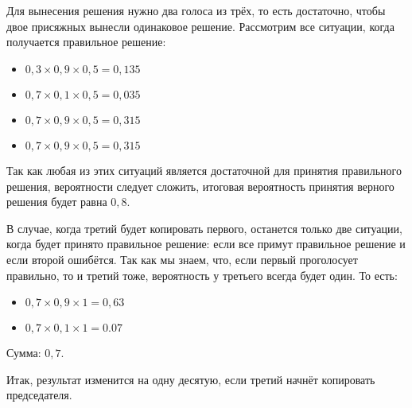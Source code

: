 \documentclass[a4paper,10pt]{article}
\begin{document}
\section{}
Для вынесения решения нужно два голоса из трёх, то есть достаточно, чтобы двое присяжных вынесли одинаковое решение. Рассмотрим все ситуации, когда получается правильное решение:
\begin{itemize}
 \item $0,3 \times 0,9 \times 0,5 = 0,135$
 \item $0,7 \times 0,1 \times 0,5 = 0,035$
 \item $0,7 \times 0,9 \times 0,5 = 0,315$
 \item $0,7 \times 0,9 \times 0,5 = 0,315$
\end{itemize}

Так как любая из этих ситуаций является достаточной для принятия правильного решения, вероятности следует сложить, итоговая вероятность принятия верного решения будет равна $0,8$.

В случае, когда третий будет копировать первого, останется только две ситуации, когда будет принято правильное решение: если все примут правильное решение и если второй ошибётся. Так как мы знаем, что, если первый проголосует правильно, то и третий тоже, вероятность у третьего всегда будет один. То есть:
\begin{itemize}
 \item $0,7 \times 0,9 \times 1 = 0,63$
 \item $0,7 \times 0,1 \times 1 = 0.07$
\end{itemize}

Сумма: $0,7$.

Итак, результат изменится на одну десятую, если третий начнёт копировать председателя.
\end{document}
